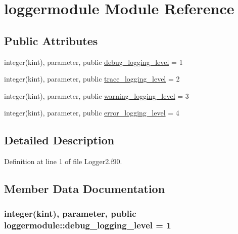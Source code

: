 \hypertarget{classloggermodule}{\section{loggermodule Module Reference}
\label{classloggermodule}
}
\subsection*{Public Attributes}
\begin{DoxyCompactItemize}
\item 
integer(kint), parameter, public \hyperlink{classloggermodule_ab08dc9280757c24edb41c3b90db4d7c4}{debug\+\_\+logging\+\_\+level} = 1
\item 
integer(kint), parameter, public \hyperlink{classloggermodule_adb73c4aacaf084ae41abab66967cf5ca}{trace\+\_\+logging\+\_\+level} = 2
\item 
integer(kint), parameter, public \hyperlink{classloggermodule_a81b6e629b304bffe7abdd8de4a80e18e}{warning\+\_\+logging\+\_\+level} = 3
\item 
integer(kint), parameter, public \hyperlink{classloggermodule_a1d52449f4ca792db29474f53836a6cc9}{error\+\_\+logging\+\_\+level} = 4
\end{DoxyCompactItemize}


\subsection{Detailed Description}


Definition at line 1 of file Logger2.\+f90.



\subsection{Member Data Documentation}
\hypertarget{classloggermodule_ab08dc9280757c24edb41c3b90db4d7c4}{
\subsubsection[{debug\+\_\+logging\+\_\+level}]{\setlength{\rightskip}{0pt plus 5cm}integer(kint), parameter, public loggermodule\+::debug\+\_\+logging\+\_\+level = 1}}\label{classloggermodule_ab08dc9280757c24edb41c3b90db4d7c4}


